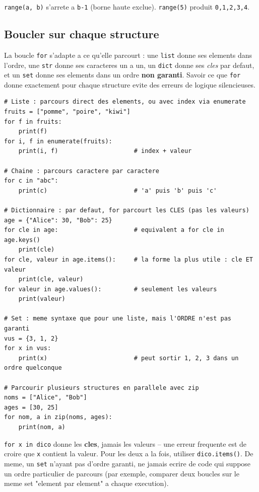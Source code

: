 \documentclass[11pt,a4paper]{article}
\begin{document}
\begin{piege}
\texttt{range(a, b)} s'arrete a \texttt{b-1} (borne haute exclue). \texttt{range(5)}
produit \texttt{0,1,2,3,4}.
\end{piege}

\subsection{Boucler sur chaque structure}
La boucle \texttt{for} s'adapte a ce qu'elle parcourt : une \texttt{list}
donne ses elements dans l'ordre, une \texttt{str} donne ses caracteres un a
un, un \texttt{dict} donne ses \emph{cles} par defaut, et un \texttt{set} donne
ses elements dans un ordre \textbf{non garanti}. Savoir ce que \texttt{for}
donne exactement pour chaque structure evite des erreurs de logique
silencieuses.

\begin{lstlisting}
# Liste : parcours direct des elements, ou avec index via enumerate
fruits = ["pomme", "poire", "kiwi"]
for f in fruits:
    print(f)
for i, f in enumerate(fruits):
    print(i, f)                     # index + valeur

# Chaine : parcours caractere par caractere
for c in "abc":
    print(c)                        # 'a' puis 'b' puis 'c'

# Dictionnaire : par defaut, for parcourt les CLES (pas les valeurs)
age = {"Alice": 30, "Bob": 25}
for cle in age:                     # equivalent a for cle in age.keys()
    print(cle)
for cle, valeur in age.items():     # la forme la plus utile : cle ET valeur
    print(cle, valeur)
for valeur in age.values():         # seulement les valeurs
    print(valeur)

# Set : meme syntaxe que pour une liste, mais l'ORDRE n'est pas garanti
vus = {3, 1, 2}
for x in vus:
    print(x)                        # peut sortir 1, 2, 3 dans un ordre quelconque

# Parcourir plusieurs structures en parallele avec zip
noms = ["Alice", "Bob"]
ages = [30, 25]
for nom, a in zip(noms, ages):
    print(nom, a)
\end{lstlisting}

\begin{piege}
\texttt{for x in dico} donne les \textbf{cles}, jamais les valeurs -- une
erreur frequente est de croire que \texttt{x} contient la valeur. Pour les
deux a la fois, utiliser \texttt{dico.items()}. De meme, un \texttt{set}
n'ayant pas d'ordre garanti, ne jamais ecrire de code qui suppose un ordre
particulier de parcours (par exemple, comparer deux boucles sur le meme set
"element par element" a chaque execution).
\end{piege}
\end{document}
